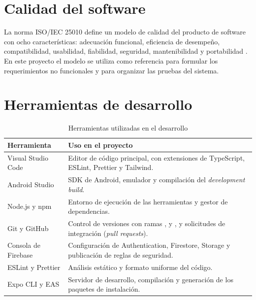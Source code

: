 \section{Calidad del software}
\label{sec:mt-calidad}

La norma ISO/IEC 25010 define un modelo de calidad del producto de software
con ocho características: adecuación funcional, eficiencia de desempeño,
compatibilidad, usabilidad, fiabilidad, seguridad, mantenibilidad y
portabilidad \citep{iso25010}. En este proyecto el modelo se utiliza como
referencia para formular los requerimientos no funcionales y para organizar
las pruebas del sistema.

\section{Herramientas de desarrollo}
\label{sec:mt-herramientas}

\begin{table}[H]
\centering
\caption{Herramientas utilizadas en el desarrollo}
\label{tab:herramientas}
\begin{tabularx}{\textwidth}{|L{3.6cm}|Y|}
\hline
{} \textbf{Herramienta} & \textbf{Uso en el proyecto} \\
\hline
Visual Studio Code & Editor de código principal, con extensiones de
TypeScript, ESLint, Prettier y Tailwind. \\ \hline
Android Studio & SDK de Android, emulador y compilación del
\emph{development build}. \\ \hline
Node.js y npm & Entorno de ejecución de las herramientas y gestor de
dependencias. \\ \hline
Git y GitHub & Control de versiones con ramas ,
 y , y solicitudes de integración
(\emph{pull requests}). \\ \hline
Consola de Firebase & Configuración de Authentication, Firestore, Storage y
publicación de reglas de seguridad. \\ \hline
ESLint y Prettier & Análisis estático y formato uniforme del código. \\ \hline
Expo CLI y EAS & Servidor de desarrollo, compilación y generación de los
paquetes de instalación. \\
\hline
\end{tabularx}
\end{table}
